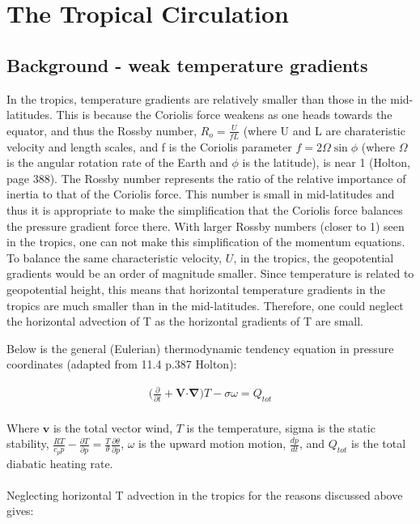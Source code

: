 \documentclass[letterpaper,12pt,titlepage,oneside,final]{book}
\begin{document}
\section{The Tropical Circulation}
\subsection{Background - weak temperature gradients}
In the tropics, temperature gradients are relatively smaller than those in the mid-latitudes. This is because the Coriolis force weakens as one heads towards the equator, and thus the Rossby number, $R_{o}=\frac{U}{fL}$ (where U and L are charateristic velocity and length scales, and f is the Coriolis parameter $f=2\Omega\sin{\phi}$ (where $\Omega$ is the angular rotation rate of the Earth and $\phi$ is the latitude), is near 1 (Holton, page 388). The Rossby number represents the ratio of the relative importance of inertia to that of the Coriolis force. This number is small in mid-latitudes and thus it is appropriate to make the simplification that the Coriolis force balances the pressure gradient force there. With larger Rossby numbers (closer to 1) seen in the tropics, one can not make this simplification of the momentum equations. To balance the same characteristic velocity, $U$, in the tropics, the geopotential gradients would be an order of magnitude smaller. Since temperature is related to geopotential height, this means that horizontal temperature gradients in the tropics are much smaller than in the mid-latitudes. Therefore, one could neglect the horizontal advection of T as the horizontal gradients of T are small. 

Below is the general (Eulerian) thermodynamic tendency equation in pressure coordinates (adapted from 11.4 p.387 Holton):

\begin{align}
\Big(\frac{\partial}{\partial{t}}+\mathbf{V}\boldsymbol{\cdot} \mathbf{\nabla}\Big)T - \sigma\omega =Q_{tot}
\end{align}
\\
Where $\mathbf{v}$ is the total vector wind, $T$ is the temperature, sigma is the static stability, $\frac{RT}{c_{p}p} - \frac{\partial{T}}{\partial{p}} = \frac{T}{\theta}\frac{\partial{\theta}}{\partial{p}}$, $\omega$ is the upward motion motion, $\frac{dp}{dt}$, and $Q_{tot}$ is the total diabatic heating rate. 
\\
\\
Neglecting horizontal T advection in the tropics for the reasons discussed above gives:
\end{document}
